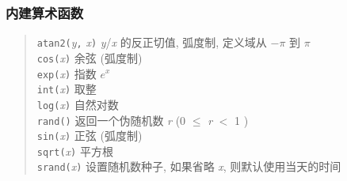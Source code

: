 \subsubsection{内建算术函数}
\begin{quote}
    \begin{tabbing}
        \texttt{atan2(}\textit{y}\texttt{,} \textit{x}\texttt{)}
        \hspace{4em} \=
        \textit{y}/\textit{x} 的反正切值, 弧度制,
        定义域从 $-\pi$ 到 $\pi$ \\

        \texttt{cos(}\textit{x}\texttt{)} \> 余弦 (弧度制) \\

        \texttt{exp(}\textit{x}\texttt{)} \> 指数 $e^x$ \\

        \texttt{int(}\textit{x}\texttt{)} \> 取整 \\

        \texttt{log(}\textit{x}\texttt{)} \> 自然对数 \\

        \texttt{rand(}\texttt{)} \> 返回一个伪随机数 \textit{r}
        (0 $\leqslant$ \textit{r} $<$ 1 )\\

        \texttt{sin(}\textit{x}\texttt{)} \> 正弦 (弧度制) \\

        \texttt{sqrt(}\textit{x}\texttt{)} \> 平方根 \\

        \texttt{srand(}\textit{x}\texttt{)} \> 设置随机数种子, 如果省略
        \textit{x}, 则默认使用当天的时间
    \end{tabbing}
\end{quote}

